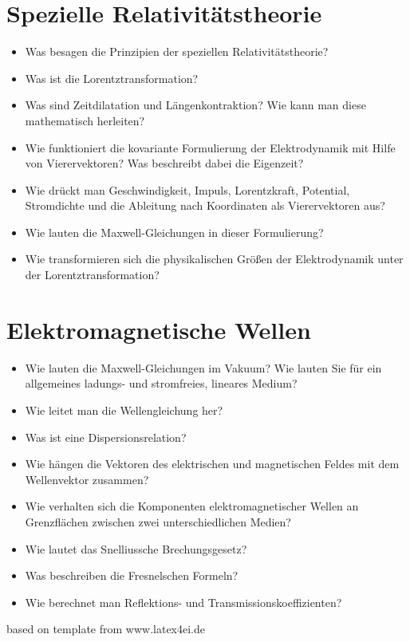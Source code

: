 \documentclass[german]{latex4ei/latex4ei_sheet}
\begin{document}
\section{Spezielle Relativitätstheorie}
\begin{itemize}
	\item Was besagen die Prinzipien der speziellen Relativitätstheorie?
	\item Was ist die Lorentztransformation?
	\item Was sind Zeitdilatation und Längenkontraktion? Wie kann man diese mathematisch herleiten?
	\item Wie funktioniert die kovariante Formulierung der Elektrodynamik mit Hilfe von Vierervektoren? Was beschreibt dabei die Eigenzeit?
	\item Wie drückt man Geschwindigkeit, Impuls, Lorentzkraft, Potential, Stromdichte und die Ableitung nach Koordinaten als Vierervektoren aus?
	\item Wie lauten die Maxwell-Gleichungen in dieser Formulierung?
	\item Wie transformieren sich die physikalischen Größen der Elektrodynamik unter der Lorentztransformation?
\end{itemize}
\section{Elektromagnetische Wellen}
\begin{itemize}
	\item Wie lauten die Maxwell-Gleichungen im Vakuum? Wie lauten Sie für ein allgemeines ladungs- und stromfreies, lineares Medium?
	\item Wie leitet man die Wellengleichung her?
	\item Was ist eine Dispersionsrelation?
	\item Wie hängen die Vektoren des elektrischen und magnetischen Feldes mit dem Wellenvektor zusammen?
	\item Wie verhalten sich die Komponenten elektromagnetischer Wellen an Grenzflächen zwischen zwei unterschiedlichen Medien?
	\item Wie lautet das Snelliussche Brechungsgesetz?
	\item Was beschreiben die Fresnelschen Formeln?
	\item Wie berechnet man Reflektions- und Transmissionskoeffizienten?
\end{itemize}

\tiny{based on template from www.latex4ei.de}
\end{document}
